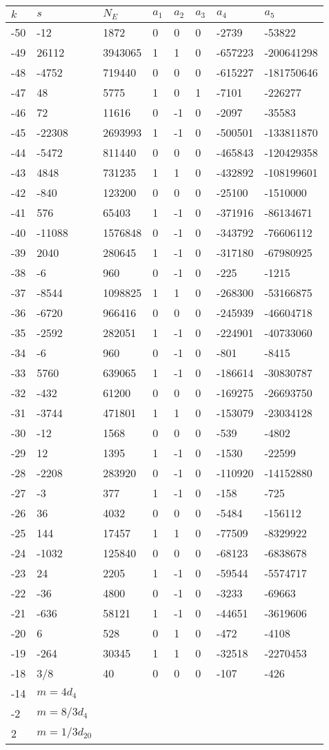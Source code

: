\documentclass{amsart}
\begin{document}
\begin{longtable}{|l|l|l|lllll|}
\hline
$k$ & $s$ & $N_E$ & $a_1$ & $a_2$ & $a_3$ & $a_4$ & $a_5$\\
\hline
-50&-12&1872&0&0&0&-2739&-53822\\
-49&26112&3943065&1&1&0&-657223&-200641298\\
-48&-4752&719440&0&0&0&-615227&-181750646\\
-47&48&5775&1&0&1&-7101&-226277\\
-46&72&11616&0&-1&0&-2097&-35583\\
-45&-22308&2693993&1&-1&0&-500501&-133811870\\
-44&-5472&811440&0&0&0&-465843&-120429358\\
-43&4848&731235&1&1&0&-432892&-108199601\\
-42&-840&123200&0&0&0&-25100&-1510000\\
-41&576&65403&1&-1&0&-371916&-86134671\\
-40&-11088&1576848&0&-1&0&-343792&-76606112\\
-39&2040&280645&1&-1&0&-317180&-67980925\\
-38&-6&960&0&-1&0&-225&-1215\\
-37&-8544&1098825&1&1&0&-268300&-53166875\\
-36&-6720&966416&0&0&0&-245939&-46604718\\
-35&-2592&282051&1&-1&0&-224901&-40733060\\
-34&-6&960&0&-1&0&-801&-8415\\
-33&5760&639065&1&-1&0&-186614&-30830787\\
-32&-432&61200&0&0&0&-169275&-26693750\\
-31&-3744&471801&1&1&0&-153079&-23034128\\
-30&-12&1568&0&0&0&-539&-4802\\
-29&12&1395&1&-1&0&-1530&-22599\\
-28&-2208&283920&0&-1&0&-110920&-14152880\\
-27&-3&377&1&-1&0&-158&-725\\
-26&36&4032&0&0&0&-5484&-156112\\
-25&144&17457&1&1&0&-77509&-8329922\\
-24&-1032&125840&0&0&0&-68123&-6838678\\
-23&24&2205&1&-1&0&-59544&-5574717\\
-22&-36&4800&0&-1&0&-3233&-69663\\
-21&-636&58121&1&-1&0&-44651&-3619606\\
-20&6&528&0&1&0&-472&-4108\\
-19&-264&30345&1&1&0&-32518&-2270453\\
-18&3/8&40&0&0&0&-107&-426\\
-14&$m=4d_{4}$&&\multicolumn{5}{c|}{}\\
-2&$m=8/3d_{4}$&&\multicolumn{5}{c|}{}\\
2&$m=1/3d_{20}$&&\multicolumn{5}{c|}{}\\
\hline
\end{longtable}
\end{document}

